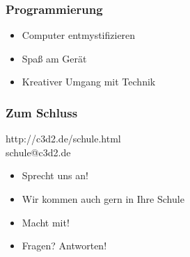 \documentclass[12pt]{beamer}
\begin{document}
\begin{frame}
  \frametitle{Programmierung}
  \begin{itemize}
    \item<2-> Computer entmystifizieren
    \item<3-> Spaß am Gerät
    \item<4-> Kreativer Umgang mit Technik
  \end{itemize}
\end{frame}

\begin{frame}
  \frametitle{Zum Schluss}
  \begin{center}
http://c3d2.de/schule.html\\
    schule@c3d2.de 
    \end{center}
  \vspace{0.2cm}
  \begin{itemize}
    \item Sprecht uns an!
    \item Wir kommen auch gern in Ihre Schule
    \item Macht mit!
    \item Fragen? Antworten!
  \end{itemize}
\end{frame}
\end{document}
